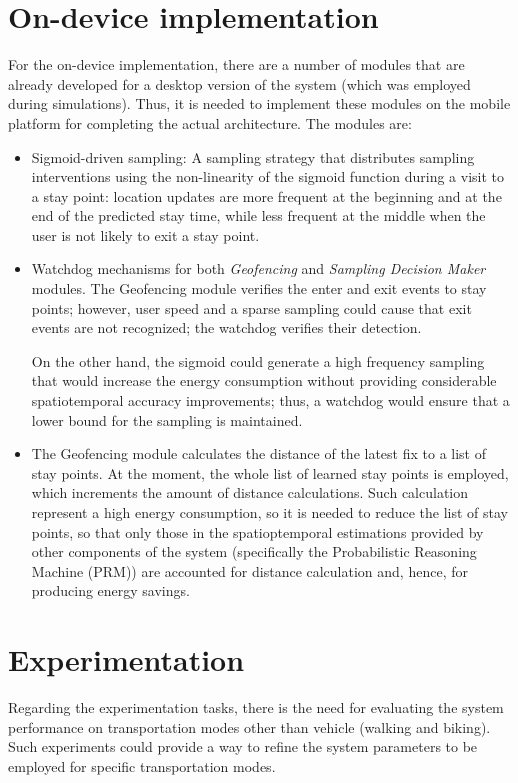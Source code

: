 \documentclass[10pt]{article}
\begin{document}
\section{On-device implementation}
For the on-device implementation, there are a number of modules that are already developed for a desktop version of the system (which was employed during simulations).
Thus, it is needed to implement these modules on the mobile platform for completing the actual architecture.
The modules are:
\begin{itemize}
	\item Sigmoid-driven sampling: A sampling strategy that distributes sampling interventions using the non-linearity of the sigmoid function during a visit to a stay point: location updates are more frequent at the beginning and at the end of the predicted stay time, while less frequent at the middle when the user is not likely to exit a stay point.
	
	\item Watchdog mechanisms for both \emph{Geofencing} and \emph{Sampling Decision Maker} modules.
	The Geofencing module verifies the enter and exit events to stay points; however, user speed and a sparse sampling could cause that exit events are not recognized; the watchdog verifies their detection.

	On the other hand, the sigmoid could generate a high frequency sampling that would increase the energy consumption without providing considerable spatiotemporal accuracy improvements; thus, a watchdog would ensure that a lower bound for the sampling is maintained.
		
	\item The Geofencing module calculates the distance of the latest fix to a list of stay points. 
	At the moment, the whole list of learned stay points is employed, which increments the amount of distance calculations.
	Such calculation represent a high energy consumption, so it is needed to reduce the list of stay points, so that only those in the spatioptemporal estimations provided by other components of the system (specifically the Probabilistic Reasoning Machine (PRM)) are accounted for distance calculation and, hence, for producing energy savings.
\end{itemize}


\section{Experimentation}
Regarding the experimentation tasks, there is the need for evaluating the system performance on transportation modes other than vehicle (walking and biking).
Such experiments could provide a way to refine the system parameters to be employed for specific transportation modes.
\end{document}
